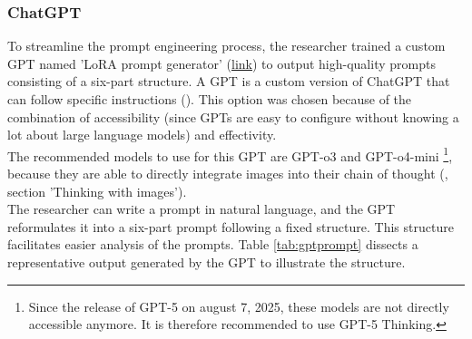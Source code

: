 \subsubsection{ChatGPT} \label{sec:ChatGPT}
To streamline the prompt engineering process, the researcher trained a custom GPT named 'LoRA prompt generator' (\href{https://chatgpt.com/g/g-68279d68896c81918191491b79281abe-lora-prompt-generator}{link}) to output high-quality prompts consisting of a six-part structure. A GPT is a custom version of ChatGPT that can follow specific instructions (\cite{openai_introducing_2023}). This option was chosen because of the combination of accessibility (since GPTs are easy to configure without knowing a lot about large language models) and effectivity.\\
The recommended models to use for this GPT are GPT-o3 and GPT-o4-mini \footnote{Since the release of GPT-5 on august 7, 2025, these models are not directly accessible anymore. It is therefore recommended to use GPT-5 Thinking.}, because they are able to directly integrate images into their chain of thought (\cite{openai_introducing_2025}, section 'Thinking with images').\\
The researcher can write a prompt in natural language, and the GPT reformulates it into a six-part prompt following a fixed structure. This structure facilitates easier analysis of the prompts. Table \ref{tab:gptprompt} dissects a representative output generated by the GPT to illustrate the structure. \\

